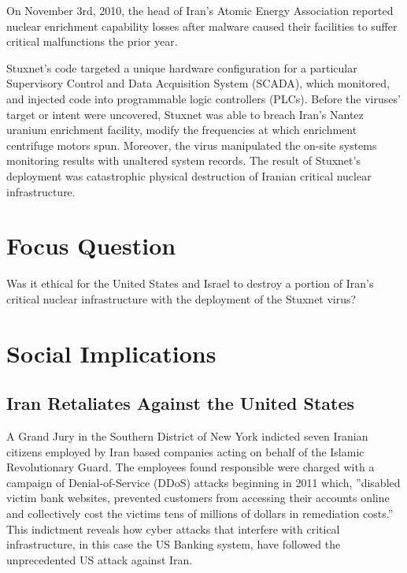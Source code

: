\documentclass[12pt]{article}
\begin{document}
\begin{multicols}{2}
On November 3rd, 2010, the head of Iran's Atomic Energy Association reported nuclear enrichment capability losses after malware caused their facilities to suffer critical malfunctions the prior year.\cite{didStuxnetTakeOut1000Centrifuges} 

Stuxnet's code targeted a unique hardware configuration for a particular Supervisory Control and Data Acquisition System (SCADA), which monitored, and injected code into programmable logic controllers (PLCs). Before the viruses' target or intent were uncovered, Stuxnet was able to breach Iran's Nantez uranium enrichment facility, modify the frequencies at which enrichment centrifuge motors spun. Moreover, the virus manipulated the on-site systems monitoring results with unaltered system records. The result of Stuxnet's deployment was catastrophic physical destruction of Iranian critical nuclear infrastructure.\cite{w32.stuxnetDossier}\cite{lessonsFromStuxnet}

\section{Focus Question}

Was it ethical for the United States and Israel to destroy a portion of Iran's critical nuclear infrastructure with the deployment of the Stuxnet virus?

\section{Social Implications}

\subsection{Iran Retaliates Against the United States}
A Grand Jury in the Southern District of New York indicted seven Iranian citizens employed by Iran based companies acting on behalf of the Islamic Revolutionary Guard. The employees found responsible were charged with a campaign of Denial-of-Service (DDoS) attacks beginning in 2011 which, ”disabled victim bank websites, prevented customers from accessing their accounts online and collectively cost the victims tens of millions of dollars in remediation costs.”\cite{sevenIraniansIndicted} This indictment reveals how cyber attacks that interfere with critical infrastructure, in this case the US Banking system, have followed the unprecedented US attack against Iran.


\end{multicols}
\end{document}
